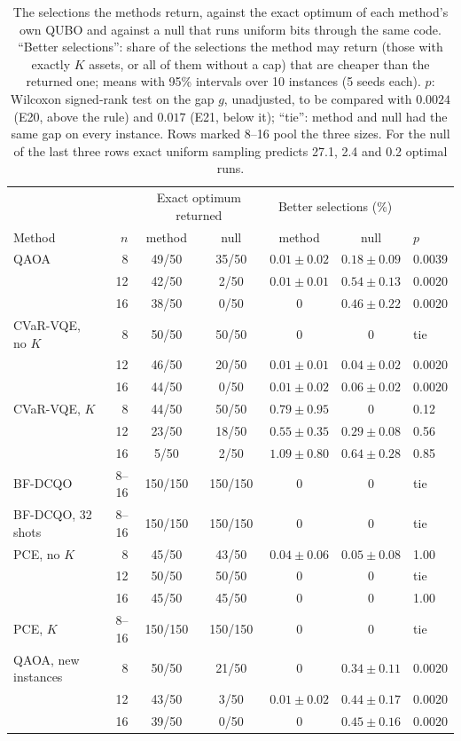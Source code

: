 \documentclass[11pt,a4paper]{article}
\begin{document}
\begin{table}[H]
\centering\footnotesize\setlength{\tabcolsep}{4pt}
\begin{tabular}{lrccccl}
\toprule
 & & \multicolumn{2}{c}{Exact optimum returned} & \multicolumn{2}{c}{Better selections (\%)} & \\
Method & $n$ & method & null & method & null & $p$ \\
\midrule
QAOA & 8 & 49/50 & 35/50 & $0.01 \pm 0.02$ & $0.18 \pm 0.09$ & 0.0039 \\
 & 12 & 42/50 & 2/50 & $0.01 \pm 0.01$ & $0.54 \pm 0.13$ & 0.0020 \\
 & 16 & 38/50 & 0/50 & 0 & $0.46 \pm 0.22$ & 0.0020 \\
CVaR-VQE, no $K$ & 8 & 50/50 & 50/50 & 0 & 0 & tie \\
 & 12 & 46/50 & 20/50 & $0.01 \pm 0.01$ & $0.04 \pm 0.02$ & 0.0020 \\
 & 16 & 44/50 & 0/50 & $0.01 \pm 0.02$ & $0.06 \pm 0.02$ & 0.0020 \\
CVaR-VQE, $K$ & 8 & 44/50 & 50/50 & $0.79 \pm 0.95$ & 0 & 0.12 \\
 & 12 & 23/50 & 18/50 & $0.55 \pm 0.35$ & $0.29 \pm 0.08$ & 0.56 \\
 & 16 & 5/50 & 2/50 & $1.09 \pm 0.80$ & $0.64 \pm 0.28$ & 0.85 \\
BF-DCQO & 8--16 & 150/150 & 150/150 & 0 & 0 & tie \\
BF-DCQO, 32 shots & 8--16 & 150/150 & 150/150 & 0 & 0 & tie \\
PCE, no $K$ & 8 & 45/50 & 43/50 & $0.04 \pm 0.06$ & $0.05 \pm 0.08$ & 1.00 \\
 & 12 & 50/50 & 50/50 & 0 & 0 & tie \\
 & 16 & 45/50 & 45/50 & 0 & 0 & 1.00 \\
PCE, $K$ & 8--16 & 150/150 & 150/150 & 0 & 0 & tie \\
\midrule
QAOA, new instances & 8 & 50/50 & 21/50 & 0 & $0.34 \pm 0.11$ & 0.0020 \\
 & 12 & 43/50 & 3/50 & $0.01 \pm 0.02$ & $0.44 \pm 0.17$ & 0.0020 \\
 & 16 & 39/50 & 0/50 & 0 & $0.45 \pm 0.16$ & 0.0020 \\
\bottomrule
\end{tabular}
\caption{The selections the methods return, against the exact
optimum of each method's own QUBO and against a null that runs uniform bits
through the same code. ``Better selections'': share of the selections the
method may return (those with exactly $K$ assets, or all of them without a
cap) that are cheaper than the returned one; means with 95\% intervals over
10 instances (5 seeds each). $p$: Wilcoxon signed-rank test on the gap
$g$, unadjusted, to be compared with $0.0024$
(E20, above the rule) and $0.017$ (E21, below it); ``tie'': method and null
had the same gap on every instance. Rows marked 8--16 pool the three sizes.
For the null of the last three rows exact uniform sampling predicts 27.1,
2.4 and 0.2 optimal runs.}
\label{tab:portfolio2}
\end{table}
\end{document}
